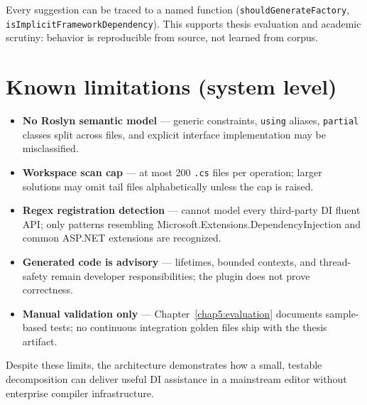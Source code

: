 Every suggestion can be traced to a named function (\texttt{shouldGenerateFactory}, \texttt{isImplicitFrameworkDependency}). This supports thesis evaluation and academic scrutiny: behavior is reproducible from source, not learned from corpus.

\section{Known limitations (system level)}
\label{chap2:limitations}

\begin{itemize}
	\item \textbf{No Roslyn semantic model} --- generic constraints, \texttt{using} aliases, \texttt{partial} classes split across files, and explicit interface implementation may be misclassified.
	\item \textbf{Workspace scan cap} --- at most 200 \texttt{.cs} files per operation; larger solutions may omit tail files alphabetically unless the cap is raised.
	\item \textbf{Regex registration detection} --- cannot model every third-party DI fluent API; only patterns resembling Microsoft.Extensions.DependencyInjection and common ASP.NET extensions are recognized.
	\item \textbf{Generated code is advisory} --- lifetimes, bounded contexts, and thread-safety remain developer responsibilities; the plugin does not prove correctness.
	\item \textbf{Manual validation only} --- Chapter~\ref{chap5:evaluation} documents sample-based tests; no continuous integration golden files ship with the thesis artifact.
\end{itemize}

Despite these limits, the architecture demonstrates how a small, testable decomposition can deliver useful DI assistance in a mainstream editor without enterprise compiler infrastructure.
